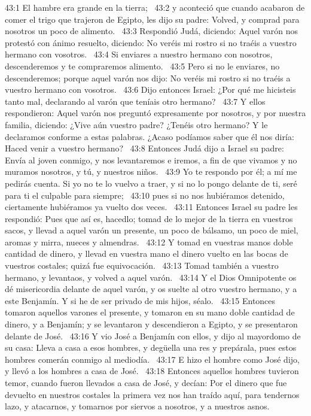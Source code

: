 43:1 El hambre era grande en la tierra;  
43:2 y aconteció que cuando acabaron de comer el trigo que trajeron de Egipto, les dijo su padre: Volved, y comprad para nosotros un poco de alimento.  
43:3 Respondió Judá, diciendo: Aquel varón nos protestó con ánimo resuelto, diciendo: No veréis mi rostro si no traéis a vuestro hermano con vosotros.  
43:4 Si enviares a nuestro hermano con nosotros, descenderemos y te compraremos alimento.  
43:5 Pero si no le enviares, no descenderemos; porque aquel varón nos dijo: No veréis mi rostro si no traéis a vuestro hermano con vosotros.  
43:6 Dijo entonces Israel: ¿Por qué me hicisteis tanto mal, declarando al varón que teníais otro hermano?  
43:7 Y ellos respondieron: Aquel varón nos preguntó expresamente por nosotros, y por nuestra familia, diciendo: ¿Vive aún vuestro padre? ¿Tenéis otro hermano? Y le declaramos conforme a estas palabras. ¿Acaso podíamos saber que él nos diría: Haced venir a vuestro hermano?  
43:8 Entonces Judá dijo a Israel su padre: Envía al joven conmigo, y nos levantaremos e iremos, a fin de que vivamos y no muramos nosotros, y tú, y nuestros niños.  
43:9 Yo te respondo por él; a mí me pedirás cuenta. Si yo no te lo vuelvo a traer, y si no lo pongo delante de ti, seré para ti el culpable para siempre;  
43:10 pues si no nos hubiéramos detenido, ciertamente hubiéramos ya vuelto dos veces.  
43:11 Entonces Israel su padre les respondió: Pues que así es, hacedlo; tomad de lo mejor de la tierra en vuestros sacos, y llevad a aquel varón un presente, un poco de bálsamo, un poco de miel, aromas y mirra, nueces y almendras.  
43:12 Y tomad en vuestras manos doble cantidad de dinero, y llevad en vuestra mano el dinero vuelto en las bocas de vuestros costales; quizá fue equivocación.  
43:13 Tomad también a vuestro hermano, y levantaos, y volved a aquel varón.  
43:14 Y el Dios Omnipotente os dé misericordia delante de aquel varón, y os suelte al otro vuestro hermano, y a este Benjamín. Y si he de ser privado de mis hijos, séalo.  
43:15 Entonces tomaron aquellos varones el presente, y tomaron en su mano doble cantidad de dinero, y a Benjamín; y se levantaron y descendieron a Egipto, y se presentaron delante de José.  
43:16 Y vio José a Benjamín con ellos, y dijo al mayordomo de su casa: Lleva a casa a esos hombres, y degüella una res y prepárala, pues estos hombres comerán conmigo al mediodía.  
43:17 E hizo el hombre como José dijo, y llevó a los hombres a casa de José.  
43:18 Entonces aquellos hombres tuvieron temor, cuando fueron llevados a casa de José, y decían: Por el dinero que fue devuelto en nuestros costales la primera vez nos han traído aquí, para tendernos lazo, y atacarnos, y tomarnos por siervos a nosotros, y a nuestros asnos.  

